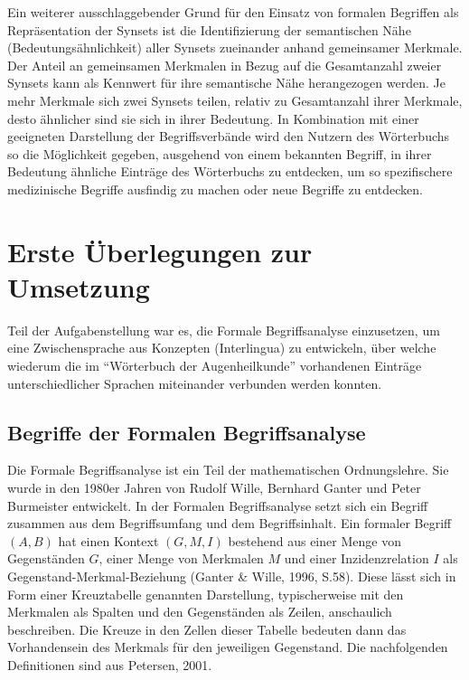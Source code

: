 \documentclass[pagesize,paper=A4,DIV=calc,fontsize=12pt,draft=false]{scrreprt}
\begin{document}
Ein weiterer ausschlaggebender Grund für den Einsatz von formalen Begriffen als Repräsentation der Synsets ist die Identifizierung der semantischen Nähe (Bedeutungsähnlichkeit) aller Synsets zueinander anhand gemeinsamer Merkmale. 
Der Anteil an gemeinsamen Merkmalen in Bezug auf die Gesamtanzahl zweier Synsets kann als Kennwert für ihre semantische Nähe herangezogen werden. 
Je mehr Merkmale sich zwei Synsets teilen, relativ zu Gesamtanzahl ihrer Merkmale, desto ähnlicher sind sie sich in ihrer Bedeutung. 
In Kombination mit einer geeigneten Darstellung der Begriffsverbände wird den Nutzern des Wörterbuchs so die Möglichkeit gegeben, ausgehend von einem bekannten Begriff, in ihrer Bedeutung ähnliche Einträge des Wörterbuchs zu entdecken, um so spezifischere medizinische Begriffe ausfindig zu machen oder neue Begriffe zu entdecken. 

\section{Erste Überlegungen zur Umsetzung}

Teil der Aufgabenstellung war es, die Formale Begriffsanalyse einzusetzen, um eine Zwischensprache aus Konzepten (Interlingua) zu entwickeln, über welche wiederum die im \enquote{Wörterbuch der Augenheilkunde} vorhandenen Einträge unterschiedlicher Sprachen miteinander verbunden werden konnten.

\subsection{Begriffe der Formalen Begriffsanalyse}
\label{subsec:fba}

Die Formale Begriffsanalyse ist ein Teil der mathematischen Ordnungslehre. 
Sie wurde in den 1980er Jahren von Rudolf Wille, Bernhard Ganter und Peter Burmeister entwickelt. 
In der Formalen Begriffsanalyse setzt sich ein Begriff zusammen aus dem Begriffsumfang und dem Begriffsinhalt. 
Ein formaler Begriff $(A,B)$ hat einen Kontext $(G,M,I)$ bestehend aus einer Menge von Gegenständen $G$, einer Menge von Merkmalen $M$ und einer Inzidenzrelation $I$ als Gegenstand-Merkmal-Beziehung (Ganter \& Wille, 1996, S.58). 
Diese lässt sich in Form einer Kreuztabelle genannten Darstellung, typischerweise mit den Merkmalen als Spalten und den Gegenständen als Zeilen, anschaulich beschreiben. 
Die Kreuze in den Zellen dieser Tabelle bedeuten dann das Vorhandensein des Merkmals für den jeweiligen Gegenstand.
Die nachfolgenden Definitionen sind aus Petersen, 2001. 
\end{document}
